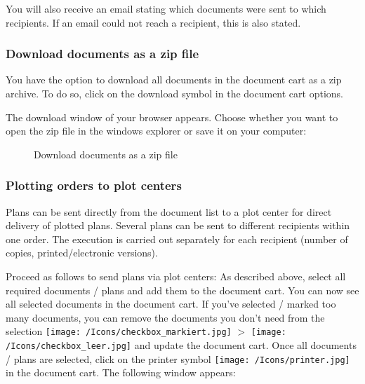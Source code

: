 You will also receive an email stating which documents were sent to which recipients. If an email could not reach a recipient, this is also stated.

\vspace{\baselineskip}

\subsubsection{Download documents as a zip file}

You have the option to download all documents in the document cart as a zip archive. To do so, click on the download symbol in the document cart options.

\vspace{\baselineskip}

The download window of your browser appears. Choose whether you want to open the zip file in the windows explorer or save it on your computer:

\begin{figure}[H]
\caption{Download documents as a zip file}
\end{figure}

\subsubsection{Plotting orders to plot centers}
\label{bkm:Ref20170609127}

Plans can be sent directly from the document list to a plot center for direct delivery of plotted plans. Several plans can be sent to different recipients within one order. The execution is carried out separately for each recipient (number of copies, printed/electronic versions).

\vspace{\baselineskip}

Proceed as follows to send plans via plot centers: As described above, select all required documents / plans and add them to the document cart. You can now see all selected documents in the document cart. If you've selected / marked too many documents, you can remove the documents you don't need from the selection \texttt{[image: /Icons/checkbox\_markiert.jpg]} $ > $ \texttt{[image: /Icons/checkbox\_leer.jpg]} and update the document cart. Once all documents / plans are selected, click on the printer symbol \texttt{[image: /Icons/printer.jpg]} in the document cart. The following window appears:

